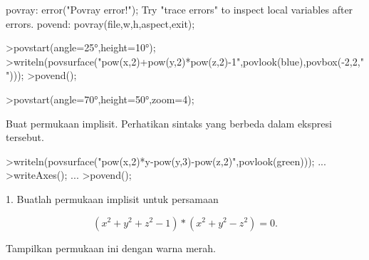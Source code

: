 \documentclass{article}
\begin{document}
\begin{eulernotebook}
\begin{eulercomment}
\begin{eulercomment}
\begin{eulercomment}
\begin{eulercomment}
\begin{eulercomment}
\begin{eulercomment}
\begin{eulercomment}
\begin{eulercomment}
\begin{eulercomment}
\begin{eulercomment}
\begin{eulercomment}
\begin{eulercomment}
\begin{eulercomment}
\begin{eulercomment}
\begin{eulercomment}
\begin{eulercomment}
\begin{eulercomment}
\begin{eulercomment}
\begin{eulercomment}
\begin{eulercomment}
\begin{eulercomment}
\begin{eulercomment}
\begin{eulercomment}
\begin{eulercomment}
\begin{eulercomment}
\begin{eulercomment}
\begin{euleroutput}
  povray:
      error("Povray error!");
  Try "trace errors" to inspect local variables after errors.
  povend:
      povray(file,w,h,aspect,exit); 
\end{euleroutput}
\begin{eulerprompt}
>povstart(angle=25°,height=10°);
>writeln(povsurface("pow(x,2)+pow(y,2)*pow(z,2)-1",povlook(blue),povbox(-2,2,"")));
>povend();
\end{eulerprompt}
\begin{eulerprompt}
>povstart(angle=70°,height=50°,zoom=4);
\end{eulerprompt}
\begin{eulercomment}
Buat permukaan implisit. Perhatikan sintaks yang berbeda dalam
ekspresi tersebut.
\end{eulercomment}
\begin{eulerprompt}
>writeln(povsurface("pow(x,2)*y-pow(y,3)-pow(z,2)",povlook(green))); ...
>writeAxes(); ...
>povend();
\end{eulerprompt}
\eulersubheading{}
\begin{eulercomment}
\end{eulercomment}
\begin{eulercomment}
1. Buatlah permukaan implisit untuk persamaan\\
\end{eulercomment}
\begin{eulerformula}
\[
(x^2+y^2+z^2-1)*(x^2+y^2-z^2)=0. 
\]
\end{eulerformula}
\begin{eulercomment}
Tampilkan permukaan ini dengan warna merah.


\end{eulercomment}
\end{eulercomment}
\end{eulercomment}
\end{eulercomment}
\end{eulercomment}
\end{eulercomment}
\end{eulercomment}
\end{eulercomment}
\end{eulercomment}
\end{eulercomment}
\end{eulercomment}
\end{eulercomment}
\end{eulercomment}
\end{eulercomment}
\end{eulercomment}
\end{eulercomment}
\end{eulercomment}
\end{eulercomment}
\end{eulercomment}
\end{eulercomment}
\end{eulercomment}
\end{eulercomment}
\end{eulercomment}
\end{eulercomment}
\end{eulercomment}
\end{eulercomment}
\end{eulercomment}
\end{eulernotebook}
\end{document}
